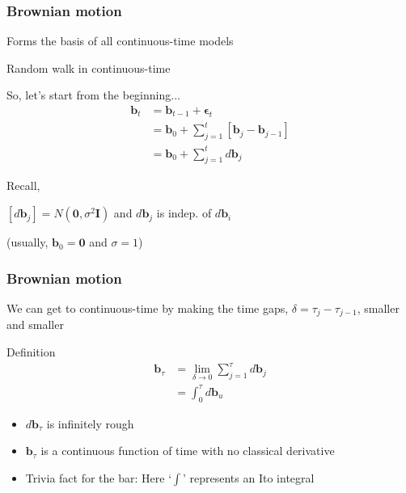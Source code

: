 \documentclass[36pt]{beamer}
\newcommand{\ft}[1]{\frametitle{#1}}
\newcommand{\bb}{\mathbf{b}}
\newcommand{\be}{\boldsymbol{\epsilon}}
\begin{document}

\begin{frame}
\ft{Brownian motion}
Forms the basis of all continuous-time models\medskip

\pause

Random walk in continuous-time \medskip

\pause

So, let's start from the beginning...
$$
\begin{aligned}
\bb_t &= \bb_{t-1} + \be_t \\
&= \bb_0 + \sum_{j=1}^{t}\left[\bb_j-\bb_{j-1}\right] \\
&= \bb_0 + \sum_{j=1}^{t} d\bb_j
\end{aligned}
$$

\pause 

Recall,

$[d\bb_j] = N(\mathbf{0},\sigma^2\mathbf{I})$ and $d\bb_j$ is indep. of $d\bb_i$

(usually, $\bb_0 = \mathbf{0}$ and $\sigma=1$)

\end{frame}


\begin{frame}
\ft{Brownian motion}
We can get to continuous-time by making the time gaps, $\delta = \tau_j-\tau_{j-1}$, smaller and smaller

\pause

\begin{block}{Definition}
$$
\begin{aligned}
\bb_\tau &= \lim_{\delta \to 0} \sum_{j=1}^\tau d\bb_j \\
&= \int_0^\tau d\bb_u
\end{aligned}
$$
\end{block}

\pause

\begin{itemize}
\item $d\bb_\tau$ is infinitely rough
\item $\bb_\tau$ is a continuous function of time with no classical derivative 
\item Trivia fact for the bar: Here `$\int$' represents an Ito integral

\end{itemize}

\end{frame}

\end{document}

